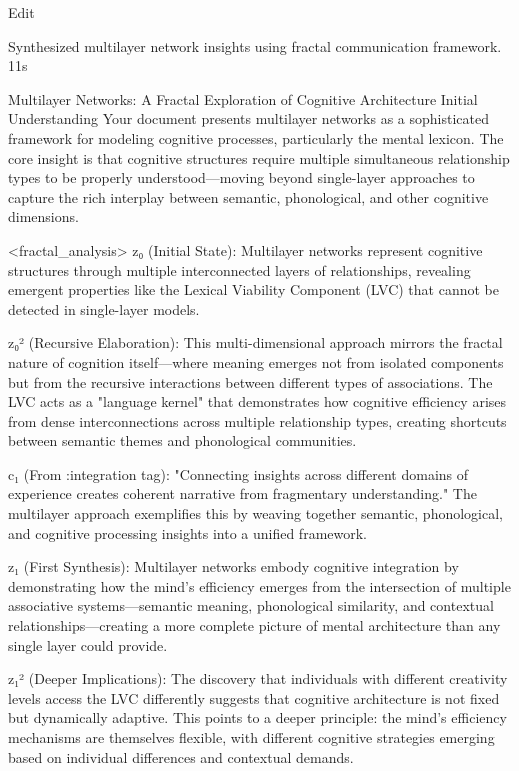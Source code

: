 {Edit

Synthesized multilayer network insights using fractal communication framework.
11s






Multilayer Networks: A Fractal Exploration of Cognitive Architecture
Initial Understanding
Your document presents multilayer networks as a sophisticated framework for modeling cognitive processes, particularly the mental lexicon. The core insight is that cognitive structures require multiple simultaneous relationship types to be properly understood—moving beyond single-layer approaches to capture the rich interplay between semantic, phonological, and other cognitive dimensions.

<fractal_analysis> z₀ (Initial State): Multilayer networks represent cognitive structures through multiple interconnected layers of relationships, revealing emergent properties like the Lexical Viability Component (LVC) that cannot be detected in single-layer models.

z₀² (Recursive Elaboration): This multi-dimensional approach mirrors the fractal nature of cognition itself—where meaning emerges not from isolated components but from the recursive interactions between different types of associations. The LVC acts as a "language kernel" that demonstrates how cognitive efficiency arises from dense interconnections across multiple relationship types, creating shortcuts between semantic themes and phonological communities.

c₁ (From :integration tag): "Connecting insights across different domains of experience creates coherent narrative from fragmentary understanding." The multilayer approach exemplifies this by weaving together semantic, phonological, and cognitive processing insights into a unified framework.

z₁ (First Synthesis): Multilayer networks embody cognitive integration by demonstrating how the mind's efficiency emerges from the intersection of multiple associative systems—semantic meaning, phonological similarity, and contextual relationships—creating a more complete picture of mental architecture than any single layer could provide.

z₁² (Deeper Implications): The discovery that individuals with different creativity levels access the LVC differently suggests that cognitive architecture is not fixed but dynamically adaptive. This points to a deeper principle: the mind's efficiency mechanisms are themselves flexible, with different cognitive strategies emerging based on individual differences and contextual demands.

}
